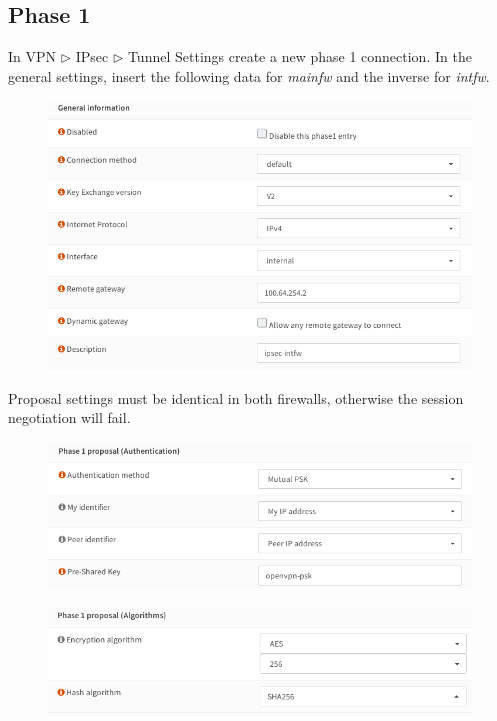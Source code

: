 \documentclass{homework}
\newcommand{\intfw}{\textit{intfw}\xspace}
\newcommand{\mainfw}{\textit{mainfw}\xspace}
\begin{document}
    \subsection{Phase 1}
    In VPN $\triangleright$ IPsec $\triangleright$ Tunnel Settings create a new phase 1 connection.
    In the general settings, insert the following data for \mainfw and the inverse for \intfw.
    \begin{figure}[H]
        \centering
        \includegraphics[width=\linewidth]{ipsec/phase1-general}
        \label{fig:ipsec-phase1-general}
    \end{figure}
    \vspace{-10pt}
%
    Proposal settings must be identical in both firewalls, otherwise the session negotiation will fail.
    \vspace{-5pt}
    \begin{figure}[H]
        \centering
        \includegraphics[width=\linewidth]{ipsec/phase1-proposal-auth}
        \label{fig:ipsec-phase1-proposal-auth}
    \end{figure}
    \begin{figure}[H]
        \centering
        \includegraphics[width=\linewidth]{ipsec/phase1-proposal-alg}
        \label{fig:ipsec-phase1-proposal-alg}
    \end{figure}
\end{document}
